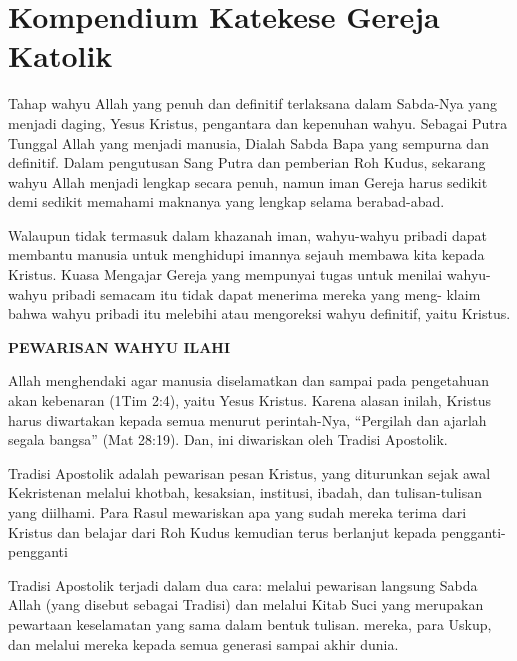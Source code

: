 \newpage
\section*{Kompendium Katekese Gereja Katolik}
\setcounter{kgkcounter}{8}
{\small

Tahap wahyu Allah yang penuh dan definitif terlaksana dalam Sabda-Nya
yang menjadi daging, Yesus Kristus, pengantara dan kepenuhan wahyu. Sebagai
Putra Tunggal Allah yang menjadi manusia, Dialah Sabda Bapa yang sempurna
dan definitif. Dalam pengutusan Sang Putra dan pemberian Roh Kudus, sekarang
wahyu Allah menjadi lengkap secara penuh, namun iman Gereja harus sedikit
demi sedikit memahami maknanya yang lengkap selama berabad-abad.

            Walaupun tidak termasuk dalam khazanah iman, wahyu-wahyu pribadi
         dapat membantu manusia untuk menghidupi imannya sejauh membawa kita
         kepada Kristus. Kuasa Mengajar Gereja yang mempunyai tugas untuk menilai
         wahyu-wahyu pribadi semacam itu tidak dapat menerima mereka yang meng-
         klaim bahwa wahyu pribadi itu melebihi atau mengoreksi wahyu definitif, yaitu
         Kristus.

                  \begin{center}\textbf{PEWARISAN WAHYU ILAHI}\end{center}

            Allah menghendaki agar manusia diselamatkan dan sampai pada pengetahuan
         akan kebenaran (1Tim 2:4), yaitu Yesus Kristus. Karena alasan inilah, Kristus harus
         diwartakan kepada semua menurut perintah-Nya, ``Pergilah dan ajarlah segala
         bangsa'' (Mat 28:19). Dan, ini diwariskan oleh Tradisi Apostolik.

        Tradisi Apostolik adalah pewarisan pesan Kristus, yang diturunkan sejak
      awal Kekristenan melalui khotbah, kesaksian, institusi, ibadah, dan tulisan-tulisan
         yang diilhami. Para Rasul mewariskan apa yang sudah mereka terima dari Kristus
         dan belajar dari Roh Kudus kemudian terus berlanjut kepada pengganti-pengganti

            Tradisi Apostolik terjadi dalam dua cara: melalui pewarisan langsung Sabda
         Allah (yang disebut sebagai Tradisi) dan melalui Kitab Suci yang merupakan
         pewartaan keselamatan yang sama dalam bentuk tulisan.
         mereka, para Uskup, dan melalui mereka kepada semua generasi sampai akhir dunia.


}